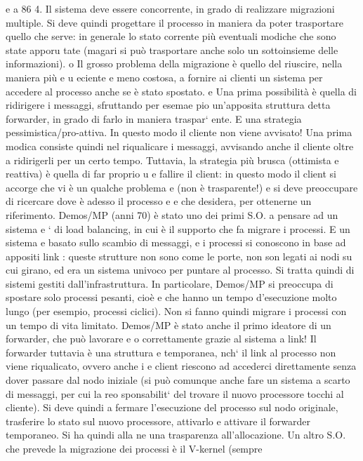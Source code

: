 e
a
86
4. Il sistema deve essere concorrente, in grado di realizzare migrazioni multiple.
Si deve quindi progettare il processo in maniera da poter trasportare quello che
serve: in generale lo stato corrente più eventuali modiche che sono state apporu
tate (magari si può trasportare anche solo un sottoinsieme delle informazioni).
o
Il grosso problema della migrazione è quello del riuscire, nella maniera più
e
u
eciente e meno costosa, a fornire ai clienti un sistema per accedere al processo
anche se è stato spostato.
e
Una prima possibilità è quella di ridirigere i messaggi, sfruttando per esemae
pio un'apposita struttura detta forwarder, in grado di farlo in maniera traspar`
ente. E una strategia pessimistica/pro-attiva. In questo modo il cliente non
viene avvisato! Una prima modica consiste quindi nel riqualicare i messaggi,
avvisando anche il cliente oltre a ridirigerli per un certo tempo.
Tuttavia, la strategia più brusca (ottimista e reattiva) è quella di far proprio
u
e
fallire il client: in questo modo il client si accorge che vi è un qualche problema
e
(non è trasparente!) e si deve preoccupare di ricercare dove è adesso il processo
e
e
che desidera, per ottenerne un riferimento.
Demos/MP (anni 70) è stato uno dei primi S.O. a pensare ad un sistema
e
`
di load balancing, in cui è il supporto che fa migrare i processi. E un sistema
e
basato sullo scambio di messaggi, e i processi si conoscono in base ad appositi
link : queste strutture non sono come le porte, non son legati ai nodi su cui
girano, ed era un sistema univoco per puntare al processo. Si tratta quindi di
sistemi gestiti dall'infrastruttura.
In particolare, Demos/MP si preoccupa di spostare solo processi pesanti, cioè
e
che hanno un tempo d'esecuzione molto lungo (per esempio, processi ciclici).
Non si fanno quindi migrare i processi con un tempo di vita limitato.
Demos/MP è stato anche il primo ideatore di un forwarder, che può lavorare
e
o
correttamente grazie al sistema a link! Il forwarder tuttavia è una struttura
e
temporanea, nch` il link al processo non viene riqualicato, ovvero anche i
e
client riescono ad accederci direttamente senza dover passare dal nodo iniziale
(si può comunque anche fare un sistema a scarto di messaggi, per cui la reo
sponsabilit` del trovare il nuovo processore tocchi al cliente). Si deve quindi
a
fermare l'esecuzione del processo sul nodo originale, trasferire lo stato sul nuovo
processore, attivarlo e attivare il forwarder temporaneo. Si ha quindi alla ne
una trasparenza all'allocazione.
Un altro S.O. che prevede la migrazione dei processi è il V-kernel (sempre
